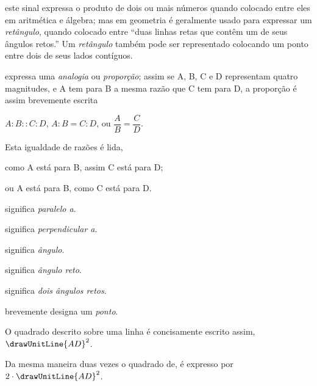 \documentclass[booklanguage=brazilian]{byrnebook}
\begin{document}
\symb{$\times$}
 este sinal expressa o produto de dois ou mais números quando colocado entre eles em aritmética e álgebra; mas em geometria é geralmente usado para expressar um \emph{retângulo}, quando colocado entre \enquote{duas linhas retas que contêm um de seus ângulos retos.} Um \emph{retângulo} também pode ser representado colocando um ponto entre dois de seus lados contíguos.

\symb{$:\ ::\ :$}
 expressa uma \emph{analogia} ou \emph{proporção}; assim se A, B, C e D representam quatro magnitudes, e A tem para B a mesma razão que C tem para D, a proporção é assim brevemente escrita

$A : B :: C : D$, $A : B = C : D$, ou $\dfrac{A}{B} = \dfrac{C}{D}$.

Esta igualdade de razões é lida,

como A está para B, assim C está para D;

ou A está para B, como C está para D.

\symb{$\parallel$}
 significa \emph{paralelo a}.

\symb{$\perp$}
 significa \emph{perpendicular a}.


 significa \emph{ângulo}.

 significa \emph{ângulo reto}.

\symb{\drawTwoRightAngles}
 significa \emph{dois ângulos retos}.


brevemente designa um \emph{ponto}.

O quadrado descrito sobre uma linha é concisamente escrito assim, $\drawUnitLine{AD}^2$.

Da mesma maneira duas vezes o quadrado de, é expresso por $2 \cdot \drawUnitLine{AD}^2$.
\end{document}
